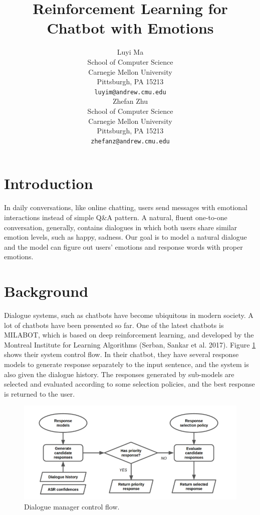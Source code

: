 \documentclass{article}
\title{Reinforcement Learning for Chatbot with Emotions}
\author{
  Luyi Ma \\
  School of Computer Science\\
  Carnegie Mellon University\\
  Pittsburgh, PA 15213 \\
  \texttt{luyim@andrew.cmu.edu} \\
  \And
  Zhefan Zhu \\
  School of Computer Science \\
  Carnegie Mellon University\\
  Pittsburgh, PA 15213 \\
  \texttt{zhefanz@andrew.cmu.edu} \\  
}
\begin{document}

\maketitle



\section{Introduction}
In daily conversations, like online chatting, users send messages with emotional interactions instead of simple Q\&A pattern. A natural, fluent one-to-one conversation, generally, contains dialogues in which both users share similar emotion levels, such as happy, sadness. Our goal is to model a natural dialogue and the model can figure out users' emotions and response words with proper emotions.


\section{Background}

Dialogue systems, such as chatbots have become ubiquitous in modern society. A lot of chatbots have been presented so far. One of the latest chatbots is MILABOT, which is based on deep reinforcement learning, and developed by the Montreal Institute for Learning Algorithms (Serban, Sankar et al. 2017). Figure \ref{fig:dialoguesystem} shows their system control flow. In their chatbot, they have several response models to generate response separately to the input sentence, and the system is also given the dialogue history. The responses generated by sub-models are selected and evaluated according to some selection policies, and the best response is returned to the user. \par 





\begin{figure}[!h]
\begin{center}
\includegraphics[scale=0.4]{figure1.png}
\caption{Dialogue manager control flow.}
\label{fig:dialoguesystem}
\end{center}
\end{figure}
\end{document}

